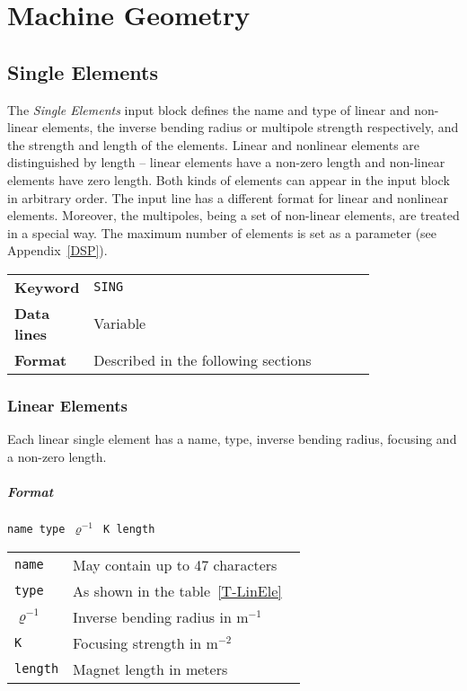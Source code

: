 
\chapter{Machine Geometry} \label{MaGe}

\section{Single Elements} \label{SinEle}

The \textit{Single Elements} input block defines the name and type of linear and non-linear elements, the inverse bending radius or multipole strength respectively, and the strength and length of the elements.
Linear and nonlinear elements are distinguished by length -- linear elements have a non-zero length and non-linear elements have zero length.
Both kinds of elements can appear in the input block in arbitrary order.
The input line has a different format for linear and nonlinear elements.
Moreover, the multipoles, being a set of non-linear elements, are treated in a special way.
The maximum number of elements is set as a parameter (see Appendix~\ref{DSP}).

\bigskip
\begin{tabular}{@{}lp{0.8\linewidth}}
    \textbf{Keyword}    & \texttt{SING} \\
    \textbf{Data lines} & Variable \\
    \textbf{Format}     & Described in the following sections
\end{tabular}

\subsection{Linear Elements} \label{LinEle}

Each linear single element has a name, type, inverse bending radius, focusing and a non-zero length.

\paragraph{Format} \texttt{name type $ \varrho^{-1} $ K length}

\bigskip
\begin{tabular}{@{}lp{0.8\linewidth}}
    \texttt{name} & May contain up to 47 characters \\
    \texttt{type} & As shown in the table~\ref{T-LinEle} \\
    \texttt{$ \varrho^{-1}$} &  Inverse bending radius in $\mathrm{m}^{-1}$ \\
    \texttt{K} & Focusing strength in $\mathrm{m}^{-2}$ \\
    \texttt{length} & Magnet length in meters
\end{tabular}

